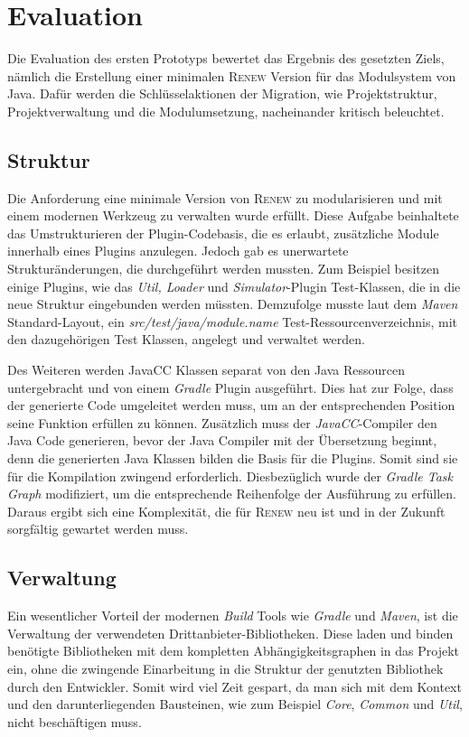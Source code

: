 \newpage  
\phantom{This text will be invisible}
\newpage
\section{Evaluation}
	Die Evaluation des ersten Prototyps bewertet das Ergebnis des gesetzten Ziels, nämlich die Erstellung einer minimalen \textsc{Renew} Version für das Modulsystem von Java. Dafür werden die Schlüsselaktionen der Migration, wie Projektstruktur, Projektverwaltung und die Modulumsetzung, nacheinander kritisch beleuchtet.

\subsection{Struktur} \label{sub:struktur}
	Die Anforderung eine minimale Version von \textsc{Renew} zu modularisieren und mit einem modernen Werkzeug zu verwalten wurde erfüllt. Diese Aufgabe beinhaltete das Umstrukturieren der Plugin-Codebasis, die es erlaubt, zusätzliche Module innerhalb eines Plugins anzulegen. Jedoch gab es unerwartete Strukturänderungen, die durchgeführt werden mussten. Zum Beispiel besitzen einige Plugins, wie das \textit{Util, Loader} und \textit{Simulator}-Plugin Test-Klassen, die in die neue Struktur eingebunden werden müssten. Demzufolge musste laut dem \textit{Maven} Standard-Layout, ein \textit{src/test/java/module.name} Test-Ressourcenverzeichnis, mit den dazugehörigen Test Klassen, angelegt und verwaltet werden. \newline

	Des Weiteren werden JavaCC Klassen separat von den Java Ressourcen untergebracht und von einem \textit{Gradle} Plugin ausgeführt. Dies hat zur Folge, dass der generierte Code umgeleitet werden muss, um an der entsprechenden Position seine Funktion erfüllen zu können. Zusätzlich muss der \textit{JavaCC}-Compiler den Java Code generieren, bevor der Java Compiler mit der Übersetzung beginnt, denn die generierten Java Klassen bilden die Basis für die Plugins. Somit sind sie für die Kompilation zwingend erforderlich. Diesbezüglich wurde der \textit{Gradle Task Graph} modifiziert, um die entsprechende Reihenfolge der Ausführung zu erfüllen. Daraus ergibt sich eine Komplexität, die für \textsc{Renew} neu ist und in der Zukunft sorgfältig gewartet werden muss. \bigbreak

\subsection{Verwaltung} \label{sub:verwaltung}
	Ein wesentlicher Vorteil der modernen \textit{Build} Tools wie \textit{Gradle} und \textit{Maven}, ist die Verwaltung der verwendeten Drittanbieter-Bibliotheken. Diese laden und binden benötigte Bibliotheken mit dem kompletten Abhängigkeitsgraphen in das Projekt ein, ohne die zwingende Einarbeitung in die Struktur der genutzten Bibliothek durch den Entwickler. Somit wird viel Zeit gespart, da man sich mit dem Kontext und den darunterliegenden Bausteinen, wie zum Beispiel \textit{Core}, \textit{Common} und \textit{Util}, nicht beschäftigen muss. \newline

